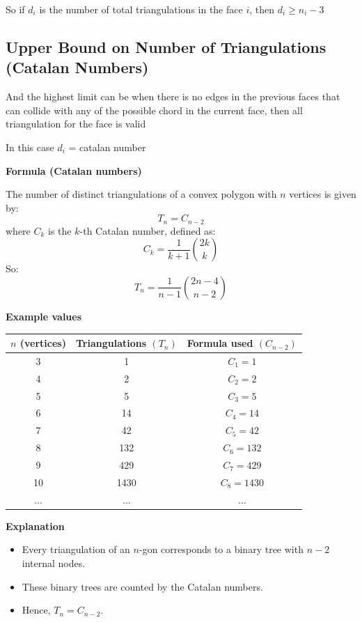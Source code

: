 \documentclass[12pt,a4paper]{article}
\begin{document}
So if $d_i$ is the number of total triangulations in the face $i$, then $d_i \geq n_i - 3$

\subsection{Upper Bound on Number of Triangulations (Catalan Numbers)}

And the highest limit can be when there is no edges in the previous faces that can collide with any of the possible chord in the current face, then all triangulation for the face is valid

In this case $d_i$ = catalan number

\textbf{Formula (Catalan numbers)}

The number of distinct triangulations of a convex polygon with $n$ vertices is given by:
\[
T_n = C_{n-2}
\]
where $C_k$ is the $k$-th Catalan number, defined as:
\[
C_k = \frac{1}{k+1}\binom{2k}{k}
\]
So:
\[
T_n = \frac{1}{n-1}\binom{2n-4}{n-2}
\]

\textbf{Example values}

\begin{center}
\begin{tabular}{|c|c|c|}
\hline
$n$ (vertices) & Triangulations $(T_n)$ & Formula used $(C_{n-2})$ \\
\hline
3 & 1 & $C_1 = 1$ \\
4 & 2 & $C_2 = 2$ \\
5 & 5 & $C_3 = 5$ \\
6 & 14 & $C_4 = 14$ \\
7 & 42 & $C_5 = 42$ \\
8 & 132 & $C_6 = 132$ \\
9 & 429 & $C_7 = 429$ \\
10 & 1430 & $C_8 = 1430$ \\
$\ldots$ & $\ldots$ & $\ldots$ \\
\hline
\end{tabular}
\end{center}

\textbf{Explanation}
\begin{itemize}
    \item Every triangulation of an $n$-gon corresponds to a binary tree with $n-2$ internal nodes.
    \item These binary trees are counted by the Catalan numbers.
    \item Hence, $T_n = C_{n-2}$.
\end{itemize}
\end{document}
